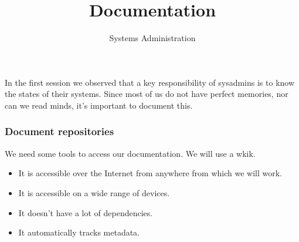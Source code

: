 \documentclass[10pt]{beamer}
\title{Documentation}
\author[IN719]{Systems Administration}
\institute[Otago Polytechnic]{
  Otago Polytechnic \\
  Dunedin, New Zealand \\
}
\date{}
\begin{document}
\begin{frame}[plain]
  \titlepage
\end{frame}

\begin{frame}
  \frametitle{}
   
   
   In the first session we observed that a key responsibility of sysadmins 
   is to know the states of their systems. Since most of us do not have perfect
   memories, nor can we read minds, it's important to document this.
\end{frame}

\begin{frame}
  \frametitle{Document repositories}
   
   We need some tools to access our documentation. We will use a wkik.
   
   \begin{itemize}
     \item It is accessible over the Internet from anywhere from which we will work.
     \item It is accessible on a wide range of devices.
     \item It doesn't have a lot of dependencies.
     \item It automatically tracks metadata.
   \end{itemize}
  
  
\end{frame}
\end{document}
